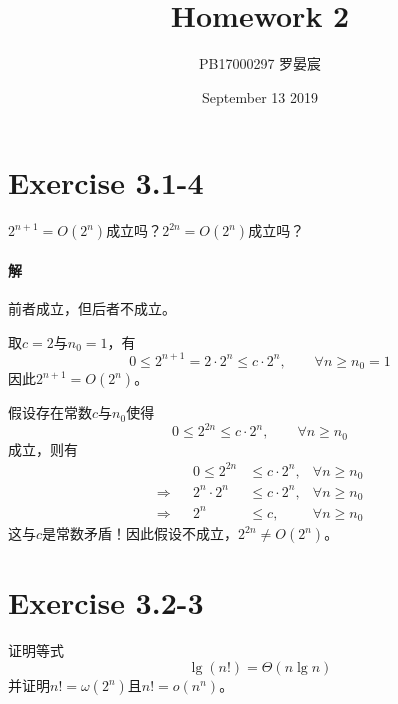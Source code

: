 \documentclass{article}
\title{Homework 2}
\author{PB17000297 罗晏宸}
\date{September 13 2019}
\begin{document}
\maketitle

\section{Exercise 3.1-4}
$2^{n+1}=O(2^n)$成立吗？$2^{2n}=O(2^n)$成立吗？
\\

\paragraph{解} 
前者成立，但后者不成立。\par
取$c=2$与$n_0=1$，有
\begin{equation*}
    0 \leq 2^{n+1} = 2 \cdot 2^n \leq c \cdot 2^n, \qquad \forall n \geq n_0 = 1
\end{equation*}
因此$2^{n+1}=O(2^n)$。\par
假设存在常数$c$与$n_0$使得
\begin{equation*}
    0 \leq 2^{2n} \leq c \cdot 2^n, \qquad \forall n \geq n_0
\end{equation*}
成立，则有
\begin{align*}
    && 0 \leq 2^{2n} &\leq c \cdot 2^n, & \forall n \geq n_0 \\
    \Rightarrow && 2^n \cdot 2^n &\leq c \cdot 2^n, &  \forall n \geq n_0 \\
    \Rightarrow && 2^n &\leq c, & \forall n \geq n_0
\end{align*}
这与$c$是常数矛盾！因此假设不成立，$2^{2n} \neq O(2^n)$。
\\

\section{Exercise 3.2-3}
证明等式
\begin{equation}
    \lg{(n!)}=\Theta(n \lg{n}) \tag{3.19}
\end{equation}
并证明$n!=\omega (2^n)$且$n!=o(n^n)$。
\\
\end{document}
